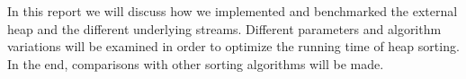 In this report we will discuss how we implemented and benchmarked the external heap and the different underlying streams. Different parameters and algorithm variations will be examined in order to optimize the running time of heap sorting. In the end, comparisons with other sorting algorithms will be made.